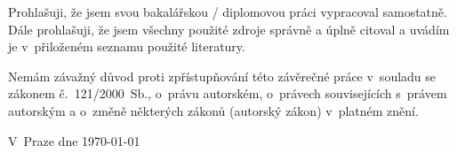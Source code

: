 Prohlašuji, že jsem svou bakalářskou / diplomovou práci vypracoval samostatně. Dále prohlašuji, že jsem všechny použité zdroje správně a úplně citoval a uvádím je v~přiloženém seznamu použité literatury.

Nemám závažný důvod proti zpřístupňování této závěrečné práce v~souladu se zákonem č.~121/2000~Sb., o~právu autorském, o~právech souvisejících s~právem autorským a o~změně některých zákonů (autorský zákon) v~platném znění.


V~Praze dne \today
